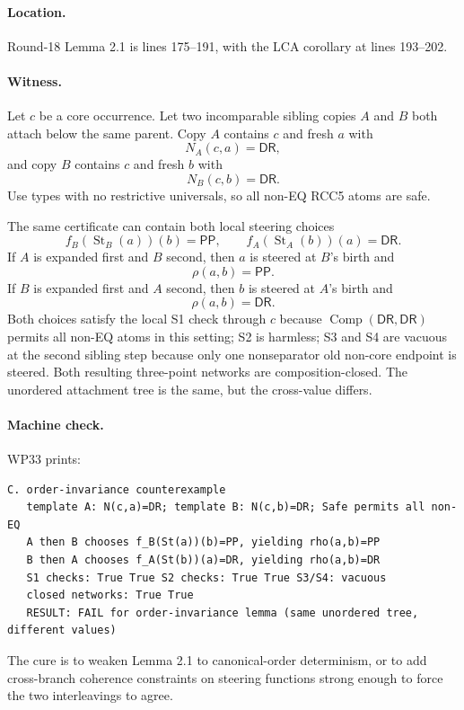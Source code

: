 \documentclass[11pt]{article}
\newcommand{\PP}{\mathsf{PP}}
\newcommand{\DR}{\mathsf{DR}}
\newcommand{\Comp}{\operatorname{Comp}}
\newcommand{\St}{\operatorname{St}}
\newcommand{\rhoR}{\rho}
\theoremstyle{remark}
\begin{document}
\paragraph{Location.}
Round-18 Lemma 2.1 is lines 175--191, with the LCA corollary at lines 193--202.

\paragraph{Witness.}
Let $c$ be a core occurrence.  Let two incomparable sibling copies $A$ and $B$ both attach below the same parent.  Copy $A$ contains $c$ and fresh $a$ with
\[
  N_A(c,a)=\DR,
\]
and copy $B$ contains $c$ and fresh $b$ with
\[
  N_B(c,b)=\DR.
\]
Use types with no restrictive universals, so all non-EQ RCC5 atoms are safe.

The same certificate can contain both local steering choices
\[
  f_B(\St_B(a))(b)=\PP,
  \qquad
  f_A(\St_A(b))(a)=\DR.
\]
If $A$ is expanded first and $B$ second, then $a$ is steered at $B$'s birth and
\[
  \rhoR(a,b)=\PP.
\]
If $B$ is expanded first and $A$ second, then $b$ is steered at $A$'s birth and
\[
  \rhoR(a,b)=\DR.
\]
Both choices satisfy the local S1 check through $c$ because $\Comp(\DR,\DR)$ permits all non-EQ atoms in this setting; S2 is harmless; S3 and S4 are vacuous at the second sibling step because only one nonseparator old non-core endpoint is steered.  Both resulting three-point networks are composition-closed.  The unordered attachment tree is the same, but the cross-value differs.

\paragraph{Machine check.}
WP33 prints:
\begin{lstlisting}[style=reviewtext]
C. order-invariance counterexample
   template A: N(c,a)=DR; template B: N(c,b)=DR; Safe permits all non-EQ
   A then B chooses f_B(St(a))(b)=PP, yielding rho(a,b)=PP
   B then A chooses f_A(St(b))(a)=DR, yielding rho(a,b)=DR
   S1 checks: True True S2 checks: True True S3/S4: vacuous
   closed networks: True True
   RESULT: FAIL for order-invariance lemma (same unordered tree, different values)
\end{lstlisting}

The cure is to weaken Lemma 2.1 to canonical-order determinism, or to add cross-branch coherence constraints on steering functions strong enough to force the two interleavings to agree.
\end{document}

